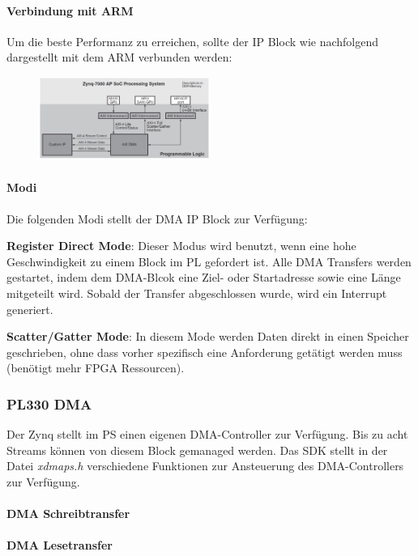 \begin{multicols}{2}
\paragraph{Verbindung mit ARM}
Um die beste  Performanz zu erreichen, sollte der IP Block wie nachfolgend dargestellt mit dem ARM verbunden werden:
\begin{figure}[H]
    \includegraphics[width=0.5\textwidth]{images/sdk_dmaip.png}
\end{figure}

\paragraph{Modi}
Die folgenden Modi stellt der DMA IP Block zur Verfügung:
\begin{compactitem}
    \item \textbf{Register Direct Mode}: Dieser Modus wird benutzt, wenn eine hohe Geschwindigkeit zu einem Block im PL gefordert ist. Alle DMA Transfers werden gestartet, indem dem DMA-Blcok eine Ziel- oder Startadresse sowie eine Länge mitgeteilt wird. Sobald der Transfer abgeschlossen wurde, wird ein Interrupt generiert.
    \item \textbf{Scatter/Gatter Mode}: In diesem Mode werden Daten direkt in einen Speicher geschrieben, ohne dass vorher spezifisch eine Anforderung getätigt werden muss (benötigt mehr FPGA Ressourcen).
\end{compactitem}
\end{multicols}
\subsubsection{PL330 DMA}
Der Zynq stellt im PS einen eigenen DMA-Controller zur Verfügung. Bis zu acht Streams können von diesem Block gemanaged werden. Das SDK stellt in der Datei \textit{xdmaps.h} verschiedene Funktionen zur Ansteuerung des DMA-Controllers zur Verfügung.

\paragraph{DMA Schreibtransfer}


\paragraph{DMA Lesetransfer}

